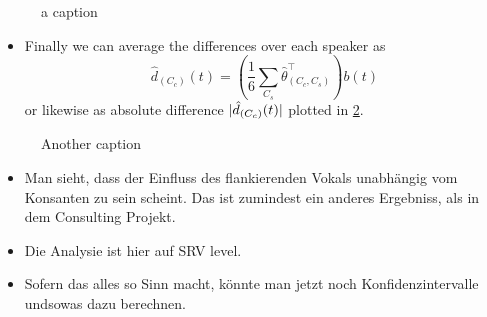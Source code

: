 \begin{figure}
  \centering
  \caption{a caption}
  \label{fig:4-diffs-vpn}
\end{figure}
\begin{itemize}
  \item Finally we can average the differences over each speaker as
    $$ \hat d_{(C_c)} (t) = \left(\frac{1}{6} \sum_{C_s} \hat \theta^\top_{(C_c, C_s)} \right) b(t)$$
    or likewise as absolute difference  $\lvert\hat d_{(C_c)}(t)\rvert$ plotted in \cref{fig:4-diffs}.
\end{itemize}
\begin{figure}
  \centering
  \caption{Another caption}
  \label{fig:4-diffs}
\end{figure}
\begin{itemize}
  \item Man sieht, dass der Einfluss des flankierenden Vokals unabhängig vom Konsanten zu sein scheint.
    Das ist zumindest ein anderes Ergebniss, als in dem Consulting Projekt.
  \item Die Analysie ist hier auf SRV level.
  \item Sofern das alles so Sinn macht, könnte man jetzt noch Konfidenzintervalle undsowas dazu berechnen.
\end{itemize}
